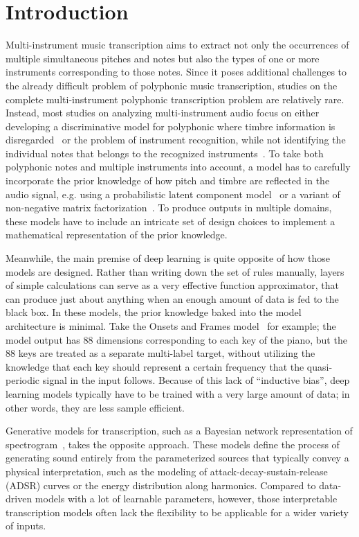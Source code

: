 \section{Introduction}

Multi-instrument music transcription aims to extract not only the occurrences of multiple simultaneous pitches and notes but also the types of one or more instruments corresponding to those notes.
Since it poses additional challenges to the already difficult problem of polyphonic music transcription, studies on the complete multi-instrument polyphonic transcription problem are relatively rare.
Instead, most studies on analyzing multi-instrument audio focus on either developing a discriminative model for polyphonic where timbre information is disregarded~\cite{bittner2017deepsalience} %
or the problem of instrument recognition, while not identifying the individual notes that belongs to the recognized instruments~\cite{lostanlen2016spiral}. %
To take both polyphonic notes and multiple instruments into account, a model has to carefully incorporate the prior knowledge of how pitch and timbre are reflected in the audio signal, e.g. using a probabilistic latent component model~\cite{benetos2015probabilistic} or a variant of non-negative matrix factorization~\cite{grindlay2009eigeninstruments}.
To produce outputs in multiple domains, these models have to include an intricate set of design choices to implement a mathematical representation of the prior knowledge.

Meanwhile, the main premise of deep learning is quite opposite of how those models are designed.
Rather than writing down the set of rules manually, layers of simple calculations can serve as a very effective function approximator, that can produce just about anything when an enough amount of data is fed to the black box.
In these models, the prior knowledge baked into the model architecture is minimal.
Take the Onsets and Frames model~\cite{hawthorne2018onsetsframes} for example; the model output has 88 dimensions corresponding to each key of the piano, but the 88 keys are treated as a separate multi-label target, without utilizing the knowledge that each key should represent a certain frequency that the quasi-periodic signal in the input follows.
Because of this lack of ``inductive bias'', deep learning models typically have to be trained with a very large amount of data; in other words, they are less sample efficient.


Generative models for transcription, such as a Bayesian network representation of spectrogram~\cite{bergkirkpatrick2014unsupervised}, takes the opposite approach.
These models define the process of generating sound entirely from the parameterized sources that typically convey a physical interpretation, such as the modeling of attack-decay-sustain-release (ADSR) curves or the energy distribution along harmonics. 
Compared to data-driven models with a lot of learnable parameters, however, those interpretable transcription models often lack the flexibility to be applicable for a wider variety of inputs.


